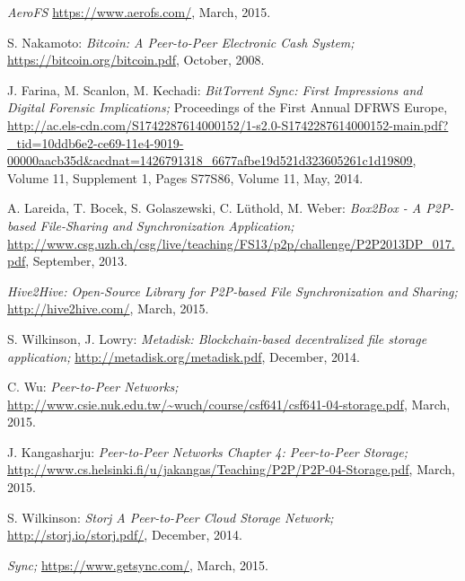 \begin{thebibliography}{99}

 \emph{AeroFS} \url{https://www.aerofs.com/}, March, 2015.

 S. Nakamoto: \emph{Bitcoin: A Peer-to-Peer Electronic Cash System;} \url{https://bitcoin.org/bitcoin.pdf}, October, 2008.

 J. Farina, M. Scanlon, M. Kechadi: \emph{BitTorrent Sync: First Impressions and Digital Forensic
Implications;} Proceedings of the First Annual DFRWS Europe, \url{http://ac.els-cdn.com/S1742287614000152/1-s2.0-S1742287614000152-main.pdf?_tid=10ddb6e2-ce69-11e4-9019-00000aacb35d&acdnat=1426791318_6677afbe19d521d323605261c1d19809}, Volume 11, Supplement 1, Pages S77\textendash S86, Volume 11, May, 2014.

 A. Lareida, T. Bocek, S. Golaszewski, C. L\"uthold, M. Weber: \emph{Box2Box - A P2P-based File-Sharing and Synchronization Application;} \url{http://www.csg.uzh.ch/csg/live/teaching/FS13/p2p/challenge/P2P2013DP_017.pdf}, September, 2013.

 \emph{Hive2Hive: Open-Source Library for P2P-based File Synchronization and Sharing;} \url{http://hive2hive.com/}, March, 2015.

 S. Wilkinson, J. Lowry: \emph{Metadisk: Blockchain-based decentralized file storage application;} \url{http://metadisk.org/metadisk.pdf}, December, 2014.

 C. Wu: \emph{Peer-to-Peer Networks;} \url{http://www.csie.nuk.edu.tw/~wuch/course/csf641/csf641-04-storage.pdf}, March, 2015.

 J. Kangasharju: \emph{Peer-to-Peer Networks Chapter 4: Peer-to-Peer Storage;} \url{http://www.cs.helsinki.fi/u/jakangas/Teaching/P2P/P2P-04-Storage.pdf}, March, 2015.

 S. Wilkinson: \emph{Storj A Peer-to-Peer Cloud Storage Network;} \url{http://storj.io/storj.pdf/}, December, 2014.

 \emph{Sync;} \url{https://www.getsync.com/}, March, 2015.

\end{thebibliography}